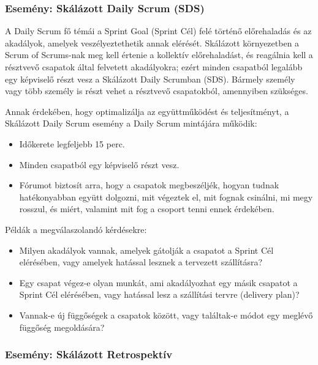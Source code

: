 \documentclass[12pt,a4paper,parskip=full]{scrartcl}
\begin{document}
\subsubsection{Esemény: Skálázott Daily Scrum (SDS)}\label{event-the-scaled-daily-scrum}

A Daily Scrum fő témái a Sprint Goal (Sprint Cél) felé történő előrehaladás és az akadályok, amelyek veszélyeztethetik annak elérését. Skálázott környezetben a Scrum of Scrums-nak meg kell értenie a kollektív előrehaladást, és reagálnia kell a résztvevő csapatok által felvetett akadályokra; ezért minden csapatból legalább egy képviselő részt vesz a Skálázott Daily Scrumban (SDS). 
Bármely személy vagy több személy is részt vehet a résztvevő csapatokból, amennyiben szükséges.

Annak érdekében, hogy optimalizálja az együttműködést és teljesítményt, a Skálázott Daily Scrum esemény a Daily Scrum mintájára működik:

\begin{itemize}
\itemsep1pt\parskip0pt
\item
 Időkerete legfeljebb 15 perc.
\item
 Minden csapatból egy képviselő részt vesz.
\item
 Fórumot biztosít arra, hogy a csapatok megbeszéljék, hogyan tudnak hatékonyabban együtt dolgozni, mit végeztek el, mit fognak csinálni, mi megy rosszul, és miért, valamint mit fog a csoport tenni ennek érdekében.
\end{itemize}

Példák a megválaszolandó kérdésekre:

\begin{itemize}
\itemsep1pt\parskip0pt
\item
 Milyen akadályok vannak, amelyek gátolják a csapatot a Sprint Cél elérésében, vagy amelyek hatással lesznek a tervezett szállításra?
\item
 Egy csapat végez-e olyan munkát, ami akadályozhat egy másik csapatot a Sprint Cél elérésében, vagy hatással lesz a szállítási tervre (delivery plan)?
\item
 Vannak-e új függőségek a csapatok között, vagy találtak-e módot egy meglévő függőség megoldására?
\end{itemize}

\subsubsection{Esemény: Skálázott Retrospektív}\label{event-the-scaled-retrospective}
\end{document}
